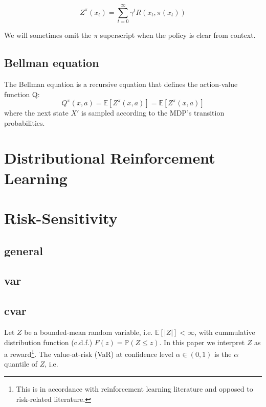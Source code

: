 \begin{equation}
Z^\pi(x_{t})=\sum_{t=0}^\infty \gamma^tR(x_t,\pi(x_t))
\end{equation}

We will sometimes omit the $\pi$ superscript when the policy is clear from context.

\subsection{Bellman equation}
The Bellman equation is a recursive equation that defines the action-value function Q:
\begin{equation}
Q^\pi(x, a) = \mathbb{E}\left[ Z^\pi(x, a) \right] = \mathbb{E}\left[ Z^\pi(x, a) \right]
\end{equation}
where the next state $X'$ is sampled according to the MDP's transition probabilities.

\section{Distributional Reinforcement Learning}




\section{Risk-Sensitivity}\label{sec:prelim:risk}

\subsection{general}

\subsection{var}

\subsection{cvar}

Let $Z$ be a bounded-mean random variable, i.e. $\mathbb{E}[|Z|] < \infty$, with cummulative distribution function (c.d.f.) $F(z) = \mathbb{P}(Z \le z)$.
In this paper we interpret $Z$ as a reward\footnote{This is in accordance with reinforcement learning literature and opposed to risk-related literature.}. The value-at-risk (VaR) at confidence level $\alpha \in (0,1)$ is the $\alpha$ quantile of $Z$, i.e. 

